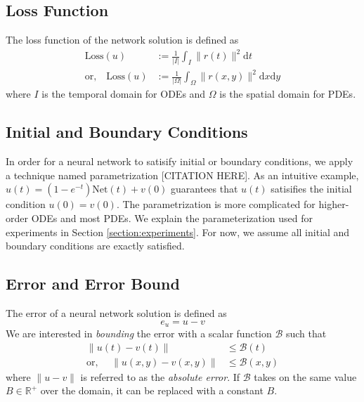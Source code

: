 \documentclass[accepted]{uai2023}
\newcommand{\Err}{e}
\newcommand{\Bound}{\mathcal{B}}
\newcommand{\Loss}{\mathrm{Loss}}
\newcommand{\Net}{\mathrm{Net}}
\begin{document}
\subsection{Loss Function}
    The loss function of the network solution is defined as 
    {
        \small
        \begin{align}
            \Loss{}(u) &:= \frac{1}{|I|} \int_{I} \|r(t)\|^2 \mathrm{d}t \\
            \text{or,} \quad 
            \Loss{}(u) &:= \frac{1}{|\Omega|} \int_{\Omega} \|r(x, y)\|^2 \mathrm{d}x\mathrm{d}y
        \end{align}
    }
    where $I$ is the temporal domain for ODEs and $\Omega$ is the spatial domain for PDEs.

\subsection{Initial and Boundary Conditions}\label{section:initial-and-boundary-conditions}
    In order for a neural network to satisify initial or boundary conditions, we apply a technique named parametrization [CITATION HERE]. 
    As an intuitive example, $u(t) = (1 - e^{-t}) \Net(t) + v(0)$ guarantees that $u(t)$ satisifies the initial condition $u(0)=v(0)$. 
    The parametrization is more complicated for higher-order ODEs and most PDEs. 
    We explain the parameterization used for experiments in Section \ref{section:experiments}. 
    For now, we assume all initial and boundary conditions are exactly satisfied.

\subsection{Error and Error Bound}
    The error of a neural network solution is defined as 
    \begin{equation}\label{eq:err-definition-master}
        \Err_u= u - v
    \end{equation}
    We are interested in \textit{bounding} the error with a scalar function $\Bound$ such that
    \begin{align}
        \|u(t) - v(t)\| &\leq \Bound(t) \\
        \text{or, } \quad \|u(x, y) - v(x, y)\| &\leq \Bound(x, y)
    \end{align}
    where $\|u - v\|$ is referred to as the \textit{absolute error}.
    If $\Bound$ takes on the same value $B \in \mathbb{R}^{+}$ over the domain, it can be replaced with a constant $B$.
\end{document}
